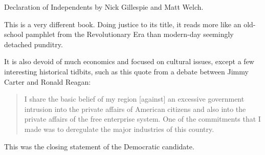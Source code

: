\book Declaration of Independents by Nick Gillespie and Matt Welch.

This is a very different book. Doing justice to its title, it reads more like
an old-school pamphlet from the Revolutionary Era than modern-day seemingly
detached punditry.

It is also devoid of much economics and focused on cultural issues, except a
few interesting historical tidbits, such as this quote from a debate between
Jimmy Carter and Ronald Reagan:

\begin{quote}
I share the basic belief of my region [against] an excessive government
intrusion into the private affairs of American citizens and also into the
private affairs of the free enterprise system. One of the commitments that I
made was to deregulate the major industries of this country.
\end{quote}

This was the closing statement of the Democratic candidate.

